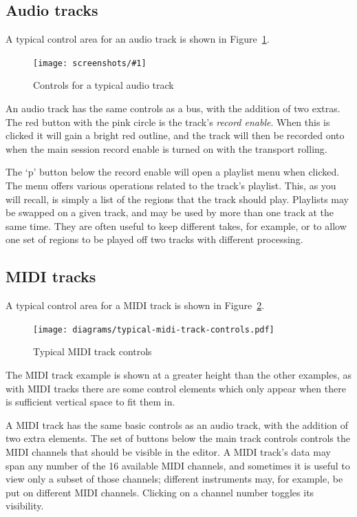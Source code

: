\documentclass[10pt,a4paper]{book}
\newcommand{\todo}[1]{\marginpar{\small\texttt{#1}}}
\newcommand{\screenshot}[3]{%
\begin{figure}[ht]%
\begin{center}
\texttt{[image: screenshots/\#1]}
\end{center}
\caption{#2}
\label{#3}
\end{figure}}
\begin{document}
{\subsection{Audio tracks}

A typical control area for an audio track is shown in Figure~\ref{fig:typical-audio-track-controls}.

\screenshot{typical-audio-track-controls.png}{Controls for a typical audio track}{fig:typical-audio-track-controls}

An audio track has the same controls as a bus, with the addition of
two extras.  The red button with the pink circle is the track's
\emph{record enable}.  When this is clicked it will gain a bright red
outline, and the track will then be recorded onto when the main
session record enable is turned on with the transport rolling.

The `p' button below the record enable will open a playlist menu when
clicked.  The menu offers various operations related to the track's
playlist.  This, as you will recall, is simply a list of the
regions that the track should play.  Playlists may be swapped on a
given track, and may be used by more than one track at the same time.
They are often useful to keep different takes, for example, or to
allow one set of regions to be played off two tracks with different
processing.

\todo{playlist menu details}


\subsection{MIDI tracks}

A typical control area for a MIDI track is shown in Figure~\ref{fig:typical-midi-track-controls}.

\begin{figure}[ht]
\begin{center}
\texttt{[image: diagrams/typical-midi-track-controls.pdf]}
\end{center}
\caption{Typical MIDI track controls}
\label{fig:typical-midi-track-controls}
\end{figure}

The MIDI track example is shown at a greater height than the other
examples, as with MIDI tracks there are some control elements which
only appear when there is sufficient vertical space to fit them in.

A MIDI track has the same basic controls as an audio track, with the
addition of two extra elements.  The set of buttons below the main
track controls controls the MIDI channels that should be visible in
the editor.  A MIDI track's data may span any number of the 16
available MIDI channels, and sometimes it is useful to view only a
subset of those channels; different instruments may, for example, be
put on different MIDI channels.  Clicking on a channel number toggles
its visibility.

}
\end{document}
